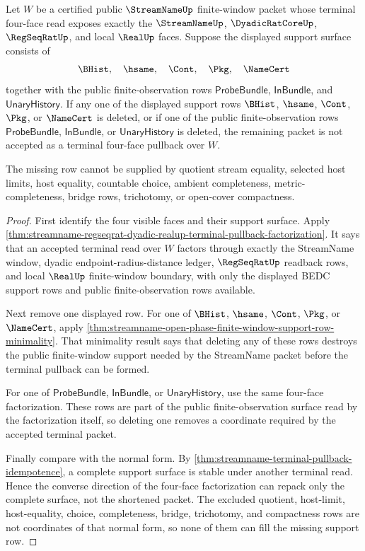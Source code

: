 \begin{theorem}
\label{thm:streamname-terminal-four-face-support-deletion-obstruction}
Let $W$ be a certified public $\StreamNameUp$ finite-window packet whose terminal
four-face read exposes exactly the $\StreamNameUp$, $\DyadicRatCoreUp$,
$\RegSeqRatUp$, and local $\RealUp$ faces. Suppose the displayed support surface
consists of
$$
\BHist,\quad \hsame,\quad \Cont,\quad \Pkg,\quad \NameCert
$$
together with the public finite-observation rows $\mathsf{ProbeBundle}$,
$\mathsf{InBundle}$, and $\mathsf{UnaryHistory}$. If any one of the displayed
support rows $\BHist$, $\hsame$, $\Cont$, $\Pkg$, or $\NameCert$ is deleted, or
if one of the public finite-observation rows $\mathsf{ProbeBundle}$,
$\mathsf{InBundle}$, or $\mathsf{UnaryHistory}$ is deleted, the remaining packet
is not accepted as a terminal four-face pullback over $W$.

The missing row cannot be supplied by quotient stream equality, selected host
limits, host equality, countable choice, ambient completeness,
metric-completeness, bridge rows, trichotomy, or open-cover compactness.
\end{theorem}
\begin{proof}
First identify the four visible faces and their support surface. Apply
\autoref{thm:streamname-regseqrat-dyadic-realup-terminal-pullback-factorization}.
It says that an accepted terminal read over $W$ factors through exactly the
StreamName window, dyadic endpoint-radius-distance ledger, $\RegSeqRatUp$
readback rows, and local $\RealUp$ finite-window boundary, with only the
displayed BEDC support rows and public finite-observation rows available.

Next remove one displayed row. For one of $\BHist$, $\hsame$, $\Cont$, $\Pkg$,
or $\NameCert$, apply
\autoref{thm:streamname-open-phase-finite-window-support-row-minimality}. That
minimality result says that deleting any of these rows destroys the public
finite-window support needed by the StreamName packet before the terminal
pullback can be formed.

For one of $\mathsf{ProbeBundle}$, $\mathsf{InBundle}$, or
$\mathsf{UnaryHistory}$, use the same four-face factorization. These rows are
part of the public finite-observation surface read by the factorization itself,
so deleting one removes a coordinate required by the accepted terminal packet.

Finally compare with the normal form. By
\autoref{thm:streamname-terminal-pullback-idempotence}, a complete support
surface is stable under another terminal read. Hence the converse direction of
the four-face factorization can repack only the complete surface, not the
shortened packet. The excluded quotient, host-limit, host-equality, choice,
completeness, bridge, trichotomy, and compactness rows are not coordinates of
that normal form, so none of them can fill the missing support row.
\end{proof}

